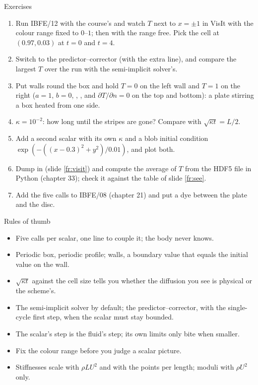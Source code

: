 \documentclass[aspectratio=169,11pt]{beamer}
\begin{document}
\begin{frame}{Exercises}
\label{fr:exercises}
\footnotesize
\begin{enumerate}
  \item Run IBFE/12 with the course's  and watch $T$ next to $x = \pm1$ in VisIt with the colour range fixed to $0$--$1$; then with the range free. Pick the cell at $(0.97, 0.03)$ at $t = 0$ and $t = 4$.
  \item Switch to the predictor--corrector (with the extra line), and compare the largest $T$ over the run with the semi-implicit solver's.
  \item Put walls round the box and hold $T = 0$ on the left wall and $T = 1$ on the right ($a = 1$, $b = 0$, , , and $\partial T/\partial n = 0$ on the top and bottom): a plate stirring a box heated from one side.
  \item $\kappa = 10^{-2}$: how long until the stripes are gone? Compare with $\sqrt{\kappa t} = L/2$.
  \item Add a second scalar  with its own $\kappa$ and a blob initial condition $\exp(-((x-0.3)^2 + y^2)/0.01)$, and plot both.
  \item Dump  in  (slide \ref{fr:visit}) and compute the average of $T$ from the HDF5 file in Python (chapter 33); check it against the table of slide \ref{fr:see}.
  \item Add the five calls to IBFE/08 (chapter 21) and put a dye between the plate and the disc.
\end{enumerate}
\end{frame}

\begin{frame}{Rules of thumb}
\label{fr:thumb}
\small
\begin{itemize}
  \item Five calls per scalar, one line to couple it; the body never knows.
  \item Periodic box, periodic profile; walls, a boundary value that equals the initial value on the wall.
  \item $\sqrt{\kappa t}$ against the cell size tells you whether the diffusion you see is physical or the scheme's.
  \item The semi-implicit solver by default; the predictor--corrector, with the single-cycle first step, when the scalar must stay bounded.
  \item The scalar's step is the fluid's step; its own limits only bite when smaller.
  \item Fix the colour range before you judge a scalar picture.
  \item Stiffnesses scale with $\rho L U^2$ and with the points per length; moduli with $\rho U^2$ only.
\end{itemize}
\end{frame}
\end{document}
